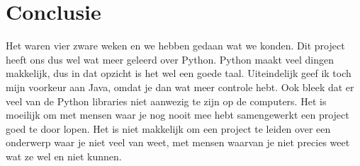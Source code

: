 \documentclass[a4paper,10pt]{article}
\begin{document}
\section{Conclusie}
Het waren vier zware weken en we hebben gedaan wat we konden.
Dit project heeft ons dus wel wat meer geleerd over Python. Python maakt veel dingen makkelijk, dus in dat opzicht is het wel een goede taal. Uiteindelijk geef ik toch mijn voorkeur aan Java, omdat je dan wat meer controle hebt. Ook bleek dat er veel van de Python libraries niet aanwezig te zijn op de computers.
Het is moeilijk om met mensen waar je nog nooit mee hebt samengewerkt een project goed te door lopen. Het is niet makkelijk om een project te leiden over een onderwerp waar je niet veel van weet, met mensen waarvan je niet precies weet wat ze wel en niet kunnen.
\end{document}

